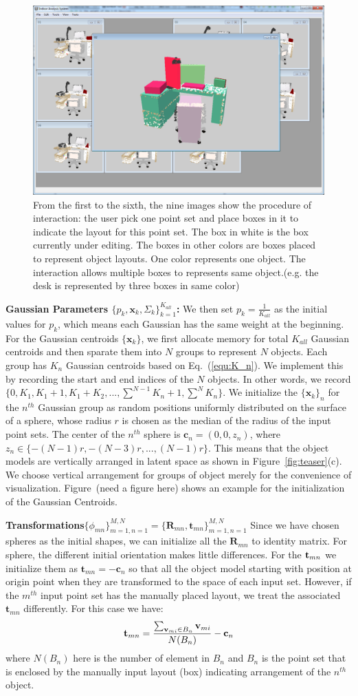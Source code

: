 \begin{figure}[htb]
	\includegraphics[width=.3\linewidth]{images/interact06.png}
	\caption{\label{fig:interact}
		From the first to the sixth, the nine images show the procedure of interaction:
		the user pick one point set and place boxes in it to indicate the layout for this point set. The box in white is the box currently under editing. The boxes in other colors are boxes placed to represent object layouts. One color represents one object. The interaction allows multiple boxes to represents same object.(e.g. the desk is represented by three boxes in same color)}
\end{figure}

\noindent\textbf{Gaussian Parameters $\{p_k,\mathbf{x}_k,\Sigma_k\}_{k=1}^{K_{all}}$:}
We then set $p_k=\frac{1}{K_{all}}$ as the initial values for $p_k$, which means each Gaussian has the same weight at the beginning. For the Gaussian centroids $\{\mathbf{x}_k\}$, we first allocate memory for total $K_{all}$ Gaussian centroids and then sparate them into $N$ groups to represent $N$ objects. Each group has $K_n$ Gaussian centroids based on Eq.~(\ref{equ:K_n}). We implement this by recording the start and end indices of the $N$ objects. In other words, we record $\{0,K_1,K_1+1,K_1+K_2,...,\sum^{N-1}K_n+1,\sum^N K_n\}$. We initialize the $\{\mathbf{x}_k\}_n$ for the $n^{th}$ Gaussian group as random positions uniformly distributed on the surface of a sphere, whose radius $r$ is chosen as the median of the radius of the input point sets. 
%
The center of the $n^{th}$ sphere is $\mathbf{c}_n=(0,0,z_n)$, where $z_n\in \{-(N-1)r,-(N-3)r,...,(N-1)r\}$.
%
This means that the object models are vertically arranged in latent space as shown in Figure~\ref{fig:teaser}(c). 
We choose vertical arrangement for groups of object merely for the convenience of visualization.
Figure~(need a figure here) shows an example for the initialization of the Gaussian Centroids.

\noindent\textbf{Transformations$\{\phi_{mn}\}_{m=1,n=1}^{M,N}=\{\mathbf{R}_{mn},\mathbf{t}_{mn}\}_{m=1,n=1}^{M,N}$}
Since we have chosen spheres as the initial shapes, we can initialize all the $\mathbf{R}_{mn}$ to identity matrix. For sphere, the different initial orientation makes little differences.
%
For the $\mathbf{t}_{mn}$ we initialize them as $\mathbf{t}_{mn}=- \mathbf{c}_n$ so that all the object model starting with position at origin point when they are transformed to the space of each input set. 
%
However, if the $m^{th}$ input point set has the manually placed layout, we treat the associated $\mathbf{t}_{mn}$ differently. For this case we have:
\begin{equation}
	\label{equ:initt}
	\mathbf{t}_{mn}=\frac{\sum_{\mathbf{v}_{mi} \in B_n}\mathbf{v}_{mi}}{N(B_n)}-\mathbf{c}_n
\end{equation}
where $N(B_n)$ here is the number of element in $B_n$ and $B_n$ is the point set that is enclosed by the manually input layout (box) indicating arrangement of the $n^{th}$ object.
